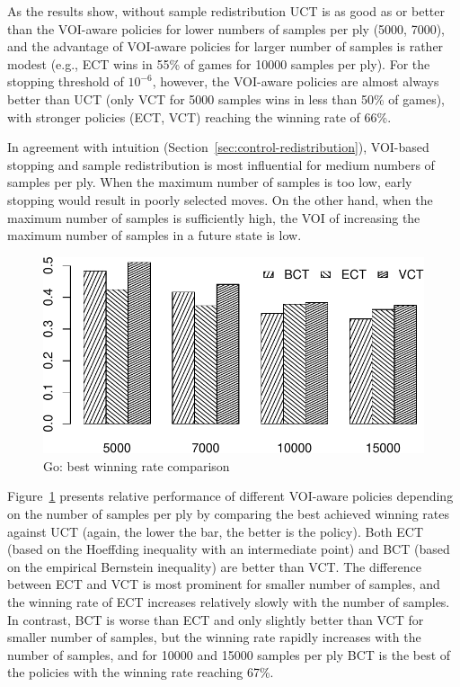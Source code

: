 \documentclass{article}
\begin{document}
As the results show, without sample redistribution UCT is as good as or
better than the VOI-aware policies for lower numbers of samples per ply
(5000, 7000), and the advantage of VOI-aware policies for larger
number of samples is rather modest (e.g., ECT wins in 55\% of games for
10000 samples per ply). For the stopping threshold of $10^{-6}$,
however, the VOI-aware policies are almost always better than UCT
(only VCT for 5000 samples wins in less than 50\% of games), with
stronger policies (ECT, VCT) reaching the winning rate of 66\%.

In agreement with intuition
(Section~\ref{sec:control-redistribution}), VOI-based stopping and sample
redistribution is most influential for medium numbers of samples per
ply. When the maximum number of samples is too low, early stopping would
result in poorly selected moves. On the other hand, when the maximum
number of samples is sufficiently high, the VOI of increasing the
maximum number of samples in a future state is low.

\begin{figure}[t]
\centering
\includegraphics[scale=0.8]{bests-bw.pdf}
\caption{Go: best winning rate comparison}
\label{fig:best-winning-rate}
\end{figure}
Figure~\ref{fig:best-winning-rate} presents relative performance of
different VOI-aware policies depending on the number of samples per
ply by comparing the best achieved winning rates against UCT (again,
the lower the bar, the better is the policy). Both ECT (based on the
Hoeffding inequality with an intermediate point) and BCT (based on the empirical
Bernstein inequality) are better than VCT. The difference between ECT
and VCT is most prominent for smaller number of samples, and the
winning rate of ECT increases relatively slowly with the number of
samples. In contrast, BCT is worse than ECT and only slightly better
than VCT for smaller number of samples, but the winning rate rapidly
increases with the number of samples, and for 10000 and 15000 samples
per ply BCT is the best of the policies with the winning rate reaching
67\%.
\end{document}
